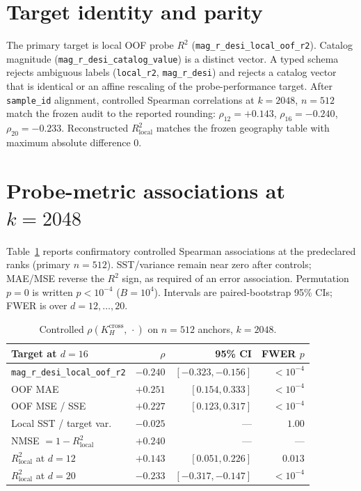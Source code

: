 \documentclass[mlabstract]{jmlr}
\begin{document}
\section{Target identity and parity}
\label{app:parity}

The primary target is local OOF probe $R^{2}$ (\texttt{mag\_r\_desi\_local\_oof\_r2}). Catalog magnitude (\texttt{mag\_r\_desi\_catalog\_value}) is a distinct vector. A typed schema rejects ambiguous labels (\texttt{local\_r2}, \texttt{mag\_r\_desi}) and rejects a catalog vector that is identical or an affine rescaling of the probe-performance target. After \texttt{sample\_id} alignment, controlled Spearman correlations at $k{=}2048$, $n{=}512$ match the frozen audit to the reported rounding: $\rho_{12}{=}+0.143$, $\rho_{16}{=}-0.240$, $\rho_{20}{=}-0.233$. Reconstructed $R^{2}_{\mathrm{local}}$ matches the frozen geography table with maximum absolute difference $0$.

\section{Probe-metric associations at $k{=}2048$}
\label{app:metrics}

Table~\ref{tab:metrics} reports confirmatory controlled Spearman associations at the predeclared ranks (primary $n{=}512$). SST/variance remain near zero after controls; MAE/MSE reverse the $R^2$ sign, as required of an error association. Permutation $p{=}0$ is written $p{<}10^{-4}$ ($B{=}10^{4}$). Intervals are paired-bootstrap 95\% CIs; FWER is over $d{=}12,\ldots,20$.

\begin{table}[h]
\caption{Controlled $\rho(K_H^{\mathrm{cross}},\,\cdot)$ on $n{=}512$ anchors, $k{=}2048$.}
\label{tab:metrics}
\centering
\footnotesize
\begin{tabular}{lrrr}
\toprule
Target at $d{=}16$ & $\rho$ & 95\% CI & FWER $p$ \\
\midrule
\texttt{mag\_r\_desi\_local\_oof\_r2} & $-0.240$ & $[-0.323,-0.156]$ & ${<}10^{-4}$ \\
OOF MAE & $+0.251$ & $[0.154,0.333]$ & ${<}10^{-4}$ \\
OOF MSE / SSE & $+0.227$ & $[0.123,0.317]$ & ${<}10^{-4}$ \\
Local SST / target var.\ & $-0.025$ & --- & $1.00$ \\
NMSE $=1-R^{2}_{\mathrm{local}}$ & $+0.240$ & --- & --- \\
\midrule
$R^{2}_{\mathrm{local}}$ at $d{=}12$ & $+0.143$ & $[0.051,0.226]$ & $0.013$ \\
$R^{2}_{\mathrm{local}}$ at $d{=}20$ & $-0.233$ & $[-0.317,-0.147]$ & ${<}10^{-4}$ \\
\bottomrule
\end{tabular}
\end{table}
\end{document}
